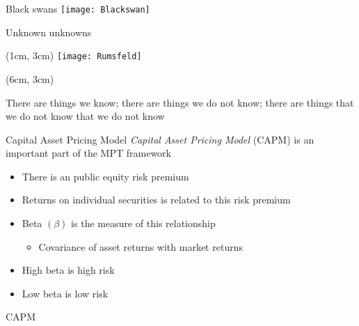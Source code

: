 \documentclass[14pt,xcolor=pdftex,dvipsnames,table]{beamer}\usepackage[]{graphicx}\usepackage[]{color}
\begin{document}
\begin{frame}{Black swans}
\centering
\texttt{[image: Blackswan]}
\end{frame}

\begin{frame}{Unknown unknowns}
\begin{textblock*}{5.2cm}(1cm, 3cm) %
\texttt{[image: Rumsfeld]}
\end{textblock*}
\begin{textblock*}{5.2cm}(6cm, 3cm)
\begin{block}{}
There are things we know; there are things we do not know; there are things that we do not know that we do not know
\end{block}
\end{textblock*}
\end{frame}

\begin{frame}{Capital Asset Pricing Model}
\emph{Capital Asset Pricing Model} (CAPM) is an important part of the MPT framework 
\pause
\begin{itemize}[<+-| alert@+>]
\item There is an public equity risk premium
\item Returns on individual securities is related to this risk premium
\item Beta $(\beta)$ is the measure of this relationship
\begin{itemize}
\item Covariance of asset returns with market returns
\end{itemize}
\item High beta is high risk 
\item Low beta is low risk
\end{itemize}
\end{frame}

\begin{frame}{CAPM}
\end{frame}
\end{document}
